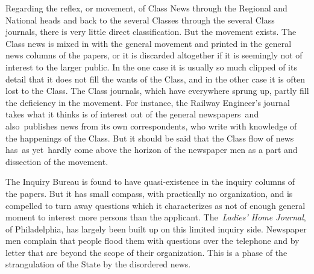 \documentclass[openany,nobib]{tufte-book}
\begin{document}
Regarding the reflex, or movement, of Class News through the Regional
and National heads and back to the several Classes through the several
Class journals, there is very little direct classification. But the
movement exists. The Class news is mixed in with the general movement
and printed in the general news columns of the papers, or it is
discarded altogether if it is seemingly not of interest to the larger
public. In the one case it is usually so much clipped of its detail that
it does not fill the wants of the Class, and in the other case it is
often lost to the Class. The Class journals, which have everywhere
sprung up, partly fill the deficiency in the movement. For instance, the
Railway Engineer's journal takes what it thinks is of interest out of
the general newspapers~and also~publishes news from its own
correspondents, who write with knowledge of the happenings of the Class.
But it should be said that the Class flow of news has~as yet~hardly come
above the horizon of the newspaper men as a part and dissection of the
movement.~

\newpage The Inquiry Bureau is found to have quasi-existence in the inquiry
columns of the papers. But it has small compass, with practically no
organization, and is compelled to turn away questions which it
characterizes as not of enough general moment to interest more persons
than the applicant. The~\emph{Ladies' Home Journal}, of Philadelphia,
has largely been built up on this limited inquiry side. Newspaper men
complain that people flood them with questions over the telephone and by
letter that are beyond the scope of their organization. This is a phase
of the strangulation of the State by the disordered news.~

\vspace{0.05in}
\end{document}
